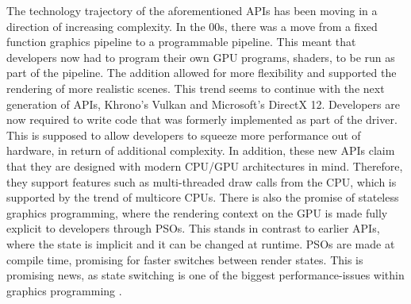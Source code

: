 The technology trajectory of the aforementioned \glspl{API} has been moving in a direction of increasing complexity.
In the 00s, there was a move from a fixed function graphics pipeline to a programmable pipeline.
This meant that developers now had to program their own GPU programs, shaders, to be run as part of the pipeline. 
The addition allowed for more flexibility and supported the rendering of more realistic scenes.
This trend seems to continue with the next generation of \glspl{API}, Khrono’s Vulkan and Microsoft’s DirectX 12. 
Developers are now required to write code that was formerly implemented as part of the driver. 
This is supposed to allow developers to squeeze more performance out of hardware,  in return of additional complexity. 
In addition, these new \glspl{API} claim that they are designed with modern \gls{CPU}/\gls{GPU} architectures in mind.  
Therefore, they support features such as multi-threaded draw calls from the \gls{CPU}, which is supported by the trend of multicore \glspl{CPU}. 
There is also the promise of stateless graphics programming, where the rendering context on the \gls{GPU} is made fully explicit to developers through \glspl{PSO}. 
This stands in contrast to earlier \glspl{API}, where the state is implicit and it can be changed at runtime. 
\glspl{PSO} are made at compile time, promising for faster switches between render states.
This is promising news, as state switching is one of the biggest performance-issues within graphics programming \cite{worister2013lazy}.